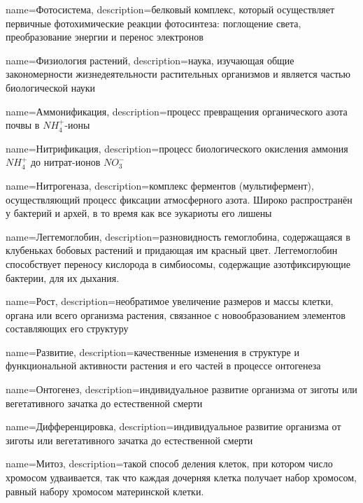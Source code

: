 {
name={Фотосистема},
description={белковый комплекс, который осуществляет первичные фотохимические реакции фотосинтеза: поглощение света, преобразование энергии и перенос электронов}
}

{
name={Физиология растений},
description={наука, изучающая общие закономерности жизнедеятельности растительных организмов и является частью биологической науки}
}

{
name={Аммонификация},
description={процесс превращения органического азота почвы в $NH^{+}_{4}$-ионы}
}

{
name={Нитрификация},
description={процесс биологического окисления аммония $NH^{+}_{4}$ до нитрат-ионов $NO^{-}_{3}$}
}

{
name={Нитрогеназа},
description={комплекс ферментов (мультифермент), осуществляющий процесс фиксации атмосферного азота. Широко распространён у бактерий и архей, в то время как все эукариоты его лишены}
}

{
name={Леггемоглобин},
description={разновидность гемоглобина, содержащаяся в клубеньках бобовых растений и придающая им красный цвет. Леггемоглобин способствует переносу кислорода в симбиосомы, содержащие азотфиксирующие бактерии, для их дыхания.}
}

{
name={Рост},
description={необратимое увеличение размеров и массы клетки, органа или всего организма растения, связанное с новообразованием элементов составляющих его структуру}
}

{
name={Развитие},
description={качественные изменения в структуре и функциональной активности растения и его частей в процессе онтогенеза}
}

{
name={Онтогенез},
description={индивидуальное развитие организма от зиготы или вегетативного зачатка до естественной смерти}
}

{
name={Дифференцировка},
description={индивидуальное развитие организма от зиготы или вегетативного зачатка до естественной смерти}
}

{
name={Митоз},
description={такой способ деления клеток, при котором число хромосом удваивается, так что каждая дочерняя клетка получает набор хромосом, равный набору хромосом материнской клетки.}
}

